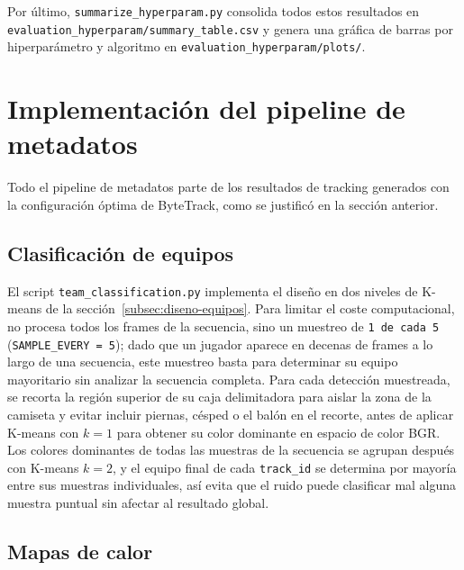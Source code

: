 Por último, \texttt{summarize\_hyperparam.py} consolida todos estos
resultados en \texttt{evaluation\_hyperparam/summary\_table.csv} y genera
una gráfica de barras por hiperparámetro y algoritmo en
\texttt{evaluation\_hyperparam/plots/}.

\section{Implementación del pipeline de metadatos}
\label{sec:implementacion-metadatos}

Todo el pipeline de metadatos parte de los resultados de tracking generados
con la configuración óptima de ByteTrack, como se
justificó en la sección anterior.

\subsection{Clasificación de equipos}
\label{subsec:impl-equipos}

El script \texttt{team\_classification.py} implementa el diseño en dos niveles de
K-means de la sección~\ref{subsec:diseno-equipos}. Para limitar el coste
computacional, no procesa todos los frames de la secuencia, sino un
muestreo de \texttt{1 de cada 5} (\texttt{SAMPLE\_EVERY = 5}); dado que un
jugador aparece en decenas de frames a lo largo de una secuencia, este
muestreo basta para determinar su equipo mayoritario sin analizar la
secuencia completa. Para cada detección muestreada, se recorta la región
superior de su caja delimitadora para aislar la
zona de la camiseta y evitar incluir piernas, césped o el balón en
el recorte, antes de aplicar K-means con $k=1$ para obtener su color
dominante en espacio de color BGR. Los colores dominantes de todas las
muestras de la secuencia se agrupan después con K-means $k=2$, y el equipo
final de cada \texttt{track\_id} se determina por mayoría entre sus
muestras individuales, así evita que el ruido puede clasificar mal alguna muestra
puntual sin afectar al resultado global.

\subsection{Mapas de calor}

